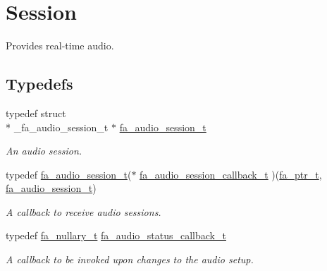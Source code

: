\hypertarget{group___fa_audio_session}{\section{Session}
\label{group___fa_audio_session}
}


Provides real-\/time audio.  


\subsection*{Typedefs}
\begin{DoxyCompactItemize}
\item 
typedef struct \\*
\-\_\-fa\-\_\-audio\-\_\-session\-\_\-t $\ast$ \hyperlink{group___fa_audio_session_ga62ee22268c23f1b18447141feccc01e0}{fa\-\_\-audio\-\_\-session\-\_\-t}
\begin{DoxyCompactList}\small\item\em An audio session. \end{DoxyCompactList}\item 
typedef \hyperlink{group___fa_audio_session_ga62ee22268c23f1b18447141feccc01e0}{fa\-\_\-audio\-\_\-session\-\_\-t}($\ast$ \hyperlink{group___fa_audio_session_gafd8f3afd0f59b1df855bbc368c2ec419}{fa\-\_\-audio\-\_\-session\-\_\-callback\-\_\-t} )(\hyperlink{group___fa_ga915ddeae99ad7568b273d2b876425197}{fa\-\_\-ptr\-\_\-t}, \hyperlink{group___fa_audio_session_ga62ee22268c23f1b18447141feccc01e0}{fa\-\_\-audio\-\_\-session\-\_\-t})
\begin{DoxyCompactList}\small\item\em A callback to receive audio sessions. \end{DoxyCompactList}\item 
typedef \hyperlink{group___fa_ga43b940a9294fd58a54087ef0b416e479}{fa\-\_\-nullary\-\_\-t} \hyperlink{group___fa_audio_session_gaac3fa018078a475e6c5ed48efcbdb887}{fa\-\_\-audio\-\_\-status\-\_\-callback\-\_\-t}
\begin{DoxyCompactList}\small\item\em A callback to be invoked upon changes to the audio setup. \end{DoxyCompactList}\end{DoxyCompactItemize}
